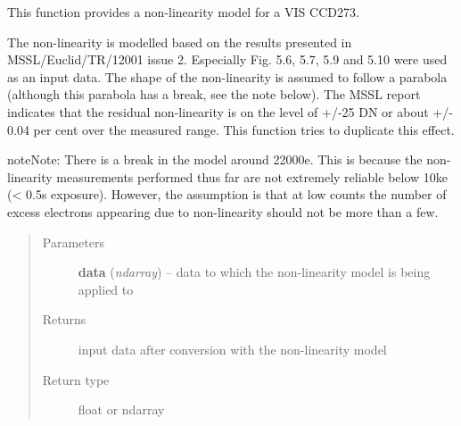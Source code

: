 \documentclass[a4paper,12pt,english]{sphinxmanual}
\begin{document}
\begin{fulllineitems}
\label{instrument:support.VISinstrumentModel.CCDnonLinearityModel}
This function provides a non-linearity model for a VIS CCD273.

The non-linearity is modelled based on the results presented in MSSL/Euclid/TR/12001 issue 2.
Especially Fig. 5.6, 5.7, 5.9 and 5.10 were used as an input data. The shape of the non-linearity is
assumed to follow a parabola (although this parabola has a break, see the note below). The MSSL report
indicates that the residual non-linearity is on the level of +/-25 DN or about +/- 0.04 per cent over
the measured range. This function tries to duplicate this effect.

\begin{notice}{note}{Note:}
There is a break in the model around 22000e. This is because the non-linearity measurements
performed thus far are not extremely reliable below 10ke (\textless{} 0.5s exposure). However, the
assumption is that at low counts the number of excess electrons appearing due to non-linearity should
not be more than a few.
\end{notice}
\begin{quote}\begin{description}
\item[{Parameters}] \leavevmode
\textbf{data} (\emph{ndarray}) -- data to which the non-linearity model is being applied to

\item[{Returns}] \leavevmode
input data after conversion with the non-linearity model

\item[{Return type}] \leavevmode
float or ndarray

\end{description}\end{quote}

\end{fulllineitems}

\end{document}
